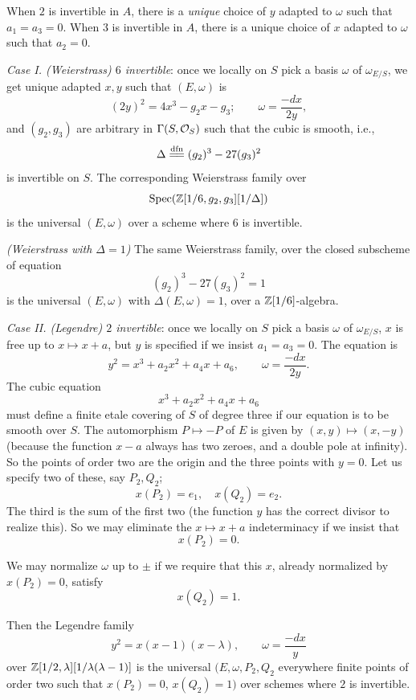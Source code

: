 \noindent When $2$ is invertible in $A$, there is a \emph{unique} choice of $y$ adapted to $\omega$ such that $a_1 = a_3 = 0$. When $3$ is invertible in $A$, there is a unique choice of $x$ adapted to $\omega$ such that $a_2 = 0$.

\kmitem\label{item:2.2.6}
\emph{Case I. (Weierstrass) $6$ invertible}: once we locally on $S$ pick a basis $\omega$ of $\omega_{E/S}$, we get unique adapted $x, y$ such that $(E, \omega)$ is
\[
(2y)^2 = 4x^3 - g_2 x - g_3; \qquad \omega = \frac{-dx}{2y},
\]
and $(g_2, g_3)$ are arbitrary in $\Gamma(S, \mathcal{O}_S)$ such that the cubic is smooth, i.e.,
\[
\Delta \xlongequal{dfn} (g_2)^3 - 27(g_3)^2
\]
is invertible on $S$. The corresponding Weierstrass family over
\[
\operatorname{Spec}(\mathbb{Z}[1/6, g_2, g_3][1/\Delta])
\]
is the universal $(E, \omega)$ over a scheme where $6$ is invertible.

\kmitem\label{item:2.2.7}
\emph{(Weierstrass with $\Delta = 1$)} The same Weierstrass family, over the closed subscheme of equation
\[
(g_2)^3 - 27(g_3)^2 = 1
\]
is the universal $(E, \omega)$ with $\Delta(E, \omega) = 1$, over a $\mathbb{Z}[1/6]$-algebra.

\kmitem\label{item:2.2.8}
\emph{Case II. (Legendre) $2$ invertible}: once we locally on $S$ pick a basis $\omega$ of $\omega_{E/S}$, $x$ is free up to $x \mapsto x + a$, but $y$ is specified if we insist $a_1 = a_3 = 0$. The equation is
\[
y^2 = x^3 + a_2 x^2 + a_4 x + a_6, \qquad \omega = \frac{-dx}{2y}.
\]
The cubic equation
\[
x^3 + a_2 x^2 + a_4 x + a_6
\]
must define a finite etale covering of $S$ of degree three if our equation is to be smooth over $S$. The automorphism $P \mapsto -P$ of $E$ is given by $(x, y) \mapsto (x, -y)$ (because the function $x - a$ always has two zeroes, and a double pole at infinity). So the points of order two are the origin and the three points with $y = 0$. Let us specify two of these, say $P_2, Q_2$;
\[
x(P_2) = e_1, \quad x(Q_2) = e_2.
\]
The third is the sum of the first two (the function $y$ has the correct divisor to realize this). So we may eliminate the $x \mapsto x + a$ indeterminacy if we insist that
\[
x(P_2) = 0.
\]

\noindent We may normalize $\omega$ up to $\pm$ if we require that this $x$, already normalized by $x(P_2) = 0$, satisfy
\[
x(Q_2) = 1.
\]

\kmitem\label{item:2.2.9}
Then the Legendre family
\[
y^2 = x(x - 1)(x - \lambda), \qquad \omega = \frac{-dx}{y}
\]
over $\mathbb{Z}[1/2, \lambda][1/\lambda(\lambda - 1)]$ is the universal $(E, \omega, P_2, Q_2$ everywhere finite points of order two such that $x(P_2) = 0$, $x(Q_2) = 1)$ over schemes where $2$ is invertible.

